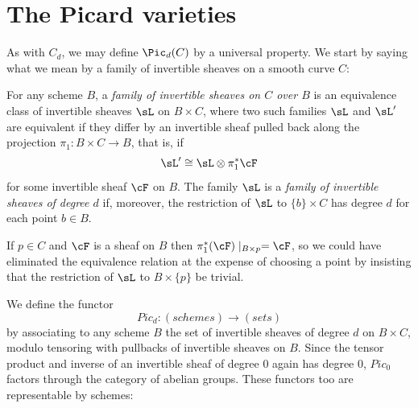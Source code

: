 \section{The Picard varieties}\label{Picard section}

As with $C_d$, we may define $\Pic_d(C)$ by a universal property. We start by saying what we mean by a family of invertible sheaves on a smooth curve $C$:

\begin{definition}
 For any scheme $B$, a \emph{family of invertible sheaves on $C$ over $B$} is an equivalence class of invertible sheaves $\sL$ on $B\times C$, where two such
 families $\sL$ and $\sL'$ are equivalent if they differ by an invertible sheaf pulled back along the projection $\pi_1: B\times C \to B$, that is, if
 $$
 \sL' \cong \sL \otimes \pi_1^*\cF
 $$
for some invertible sheaf $\cF$ on $B$.
The family $\sL$  is a \emph{family of invertible sheaves of degree $d$} if, moreover, the restriction of $\sL$
 to $\{b\}\times C$ has degree $d$ for each point $b\in B$. 
 \end{definition}

If $p \in C$ and $\cF$ is a sheaf on $B$ then $\pi_1^*(\cF)\mid_{B\times p} = \cF$, so we could have eliminated the
equivalence relation at the expense of choosing a point by insisting that the restriction of $\sL$ to $B \times \{p\}$ be trivial.
 
 

 

We define the functor
 $$
 Pic_d : (schemes) \to (sets)
 $$
 by associating to any scheme $B$ the set of invertible sheaves of degree $d$ on $B \times C$, modulo tensoring with pullbacks of invertible sheaves on $B$. Since the tensor product and inverse of an invertible sheaf of degree 0 again has degree 0, 
 $Pic_0$ factors through the category of abelian groups. These functors too are representable by schemes:
  
